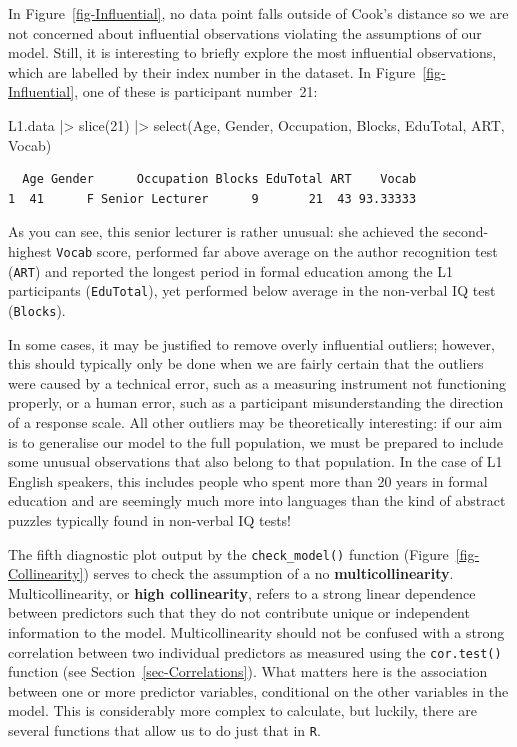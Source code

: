 \documentclass[
  letterpaper,
  DIV=11,
  numbers=noendperiod]{scrreprt}
\newenvironment{Shaded}{\begin{snugshade}}{\end{snugshade}}
\newcommand{\DecValTok}[1]{\textcolor[rgb]{0.68,0.00,0.00}{#1}}
\newcommand{\FunctionTok}[1]{\textcolor[rgb]{0.28,0.35,0.67}{#1}}
\newcommand{\NormalTok}[1]{\textcolor[rgb]{0.00,0.23,0.31}{#1}}
\newcommand{\SpecialCharTok}[1]{\textcolor[rgb]{0.37,0.37,0.37}{#1}}
\begin{document}
In Figure~\ref{fig-Influential}, no data point falls outside of Cook's
distance so we are not concerned about influential observations
violating the assumptions of our model. Still, it is interesting to
briefly explore the most influential observations, which are labelled by
their index number in the dataset. In Figure~\ref{fig-Influential}, one
of these is participant number~21:

\begin{Shaded}
\begin{Highlighting}[]
\NormalTok{L1.data }\SpecialCharTok{|\textgreater{}} 
  \FunctionTok{slice}\NormalTok{(}\DecValTok{21}\NormalTok{) }\SpecialCharTok{|\textgreater{}} 
  \FunctionTok{select}\NormalTok{(Age, Gender, Occupation, Blocks, EduTotal, ART, Vocab)}
\end{Highlighting}
\end{Shaded}

\begin{verbatim}
  Age Gender      Occupation Blocks EduTotal ART    Vocab
1  41      F Senior Lecturer      9       21  43 93.33333
\end{verbatim}

As you can see, this senior lecturer is rather unusual: she achieved the
second-highest \texttt{Vocab} score, performed far above average on the
author recognition test (\texttt{ART}) and reported the longest period
in formal education among the L1 participants (\texttt{EduTotal}), yet
performed below average in the non-verbal IQ test (\texttt{Blocks}).

In some cases, it may be justified to remove overly influential
outliers; however, this should typically only be done when we are fairly
certain that the outliers were caused by a technical error, such as a
measuring instrument not functioning properly, or a human error, such as
a participant misunderstanding the direction of a response scale. All
other outliers may be theoretically interesting: if our aim is to
generalise our model to the full population, we must be prepared to
include some unusual observations that also belong to that population.
In the case of L1 English speakers, this includes people who spent more
than 20 years in formal education and are seemingly much more into
languages than the kind of abstract puzzles typically found in
non-verbal IQ tests!

The fifth diagnostic plot output by the \texttt{check\_model()} function
(Figure~\ref{fig-Collinearity}) serves to check the assumption of a no
\textbf{multicollinearity}. Multicollinearity, or \textbf{high
collinearity}, refers to a strong linear dependence between predictors
such that they do not contribute unique or independent information to
the model. Multicollinearity should not be confused with a strong
correlation between two individual predictors as measured using the
\texttt{cor.test()} function (see Section~\ref{sec-Correlations}). What
matters here is the association between one or more predictor variables,
conditional on the other variables in the model. This is considerably
more complex to calculate, but luckily, there are several functions that
allow us to do just that in \texttt{R}.
\end{document}
